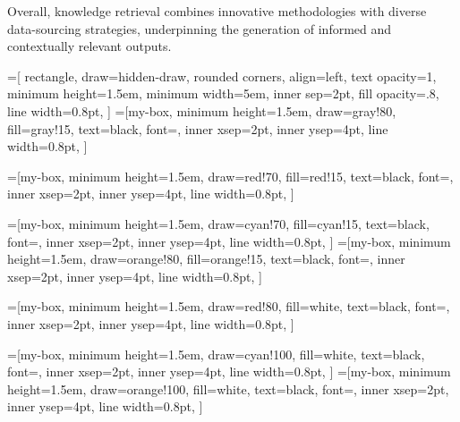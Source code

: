 \documentclass[lettersize,journal]{IEEEtran}
\begin{document}

Overall, knowledge retrieval combines innovative methodologies with diverse data-sourcing strategies, underpinning the generation of informed and contextually relevant outputs.



=[
    rectangle,
    draw=hidden-draw,
    rounded corners,
    align=left,
    text opacity=1,
    minimum height=1.5em,
    minimum width=5em,
    inner sep=2pt,
    fill opacity=.8,
    line width=0.8pt,
]
=[my-box, minimum height=1.5em,
    draw=gray!80, 
    fill=gray!15,  
    text=black, font=\normalsize,
    inner xsep=2pt,
    inner ysep=4pt,
    line width=0.8pt,
]

=[my-box, minimum height=1.5em,
    draw=red!70, 
    fill=red!15,  
    text=black, font=\normalsize,
    inner xsep=2pt,
    inner ysep=4pt,
    line width=0.8pt,
]

=[my-box, minimum height=1.5em,
    draw=cyan!70, 
    fill=cyan!15,  
    text=black, font=\normalsize,
    inner xsep=2pt,
    inner ysep=4pt,
    line width=0.8pt,
]
=[my-box, minimum height=1.5em,
    draw=orange!80, 
    fill=orange!15,  
    text=black, font=\normalsize,
    inner xsep=2pt,
    inner ysep=4pt,
    line width=0.8pt,
]

=[my-box, minimum height=1.5em,
    draw=red!80, 
    fill=white,  
    text=black, font=\normalsize,
    inner xsep=2pt,
    inner ysep=4pt,
    line width=0.8pt,
]

=[my-box, minimum height=1.5em,
    draw=cyan!100, 
    fill=white,  
    text=black, font=\normalsize,
    inner xsep=2pt,
    inner ysep=4pt,
    line width=0.8pt,
]
=[my-box, minimum height=1.5em,
    draw=orange!100, 
    fill=white,  
    text=black, font=\normalsize,
    inner xsep=2pt,
    inner ysep=4pt,
    line width=0.8pt,
]
\end{document}
